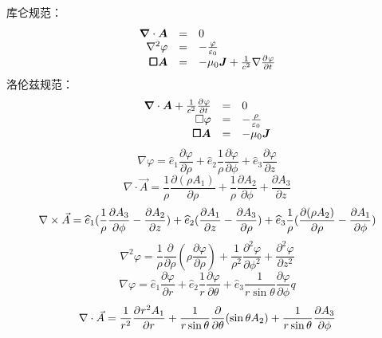\documentclass[UTF8,9pt]{ctexart}
\begin{document}
库仑规范：
$$\ar[rcl]{
    \bm{\nabla}\cdot \bm{A}&=&0\\
    \nabla^2 \varphi&=&-\f{\varphi}{\epsilon_0}\\
    \bm{\square A}&=&-\mu_0\bm{J}+\ff{c^2}\nabla\pt{\varphi}
}$$
洛伦兹规范：
$$\ar[rcl]{
    \bm{\nabla}\cdot\bm{A}+\ff{c^2}\pt{\varphi}&=&0\\
    \square \varphi&=&-\f{\rho}{\epsilon_0}\\
    \bm{\square A}&=&-\mu_0\bm{J}
}$$
$$\nabla \varphi = \hat e_1 \frac { \partial \varphi } { \partial \rho } + \hat e_2 \frac { 1 } { \rho } \frac { \partial \varphi } { \partial \phi } + \hat { e } _ { 3 } \frac { \partial \varphi } { \partial z }$$
$$\nabla \cdot \vec { A } = \frac { 1 } { \rho } \frac { \partial ( \rho A _ { 1 } ) } { \partial \rho } + \frac { 1 } { \rho } \frac { \partial A _ { 2 } } { \partial \phi } + \frac { \partial A _ { 3 } } { \partial z }$$
$$ { \nabla \times \vec { A } } =\hat e_1 (\ff{\rho} \frac { \partial A_3} { \partial \phi } - \frac { \partial A _ { 2 } } { \partial z } ) + \hat { e } _ { 2 } ( \frac { \partial A _ { 1 } } { \partial z } - \frac { \partial A _ { 3 } } { \partial \rho } ) + \hat { e } _ { 3 } \frac { 1 } { \rho } ( \frac { \partial ( \rho A _ { 2 } ) } { \partial \rho } - \frac { \partial A _ { 1 } } { \partial \phi } )$$
$$\nabla ^ { 2 } \varphi = \frac { 1 } { \rho } \frac { \partial } { \partial \rho } ( \rho \frac { \partial \varphi } { \partial \rho } ) + \frac { 1 } { \rho ^ { 2 } } \frac { \partial ^ { 2 } \varphi } { \partial \phi ^ { 2 } } + \frac { \partial ^ { 2 } \varphi } { \partial z ^ { 2 } }$$
$$\nabla \varphi = \hat { e } _ { 1 } \frac { \partial \varphi } { \partial r } + \hat { e } _ { 2 } \frac { 1 } { r } \frac { \partial \varphi } { \partial \theta } + \hat { e } _ { 3 } \frac { 1 } { r \sin \theta } \frac { \partial \varphi } { \partial \phi }q$$
$$\nabla \cdot \vec { A } = \ff{r^2} \pp{r^2A_1}{r} + \frac { 1 } { r \sin \theta } \frac { \partial } { \partial \theta } ( \sin \theta A _ { 2 } ) + \frac { 1 } { r \sin \theta } \frac { \partial A _ { 3 } } { \partial \phi }$$
\end{document}
